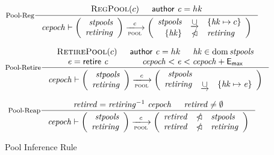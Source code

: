 \begin{figure}
  \begin{equation}\label{eq:pool-reg}
    \inference[Pool-Reg]
    {
      \RegPool{c} & \cauthor{c} = hk
    }
    {
      \var{cepoch} \vdash
      \left(
      \begin{array}{r}
        \var{stpools} \\
        \var{retiring}
      \end{array}
      \right)
      \trans{pool}{c}
      \left(
      \begin{array}{rcl}
        \var{stpools} & \unionoverride & \{\var{hk} \mapsto c\} \\
        \{\var{hk}\} & \subtractdom & \var{retiring} \\
      \end{array}
      \right)
    }
  \end{equation}


  \begin{equation}\label{eq:pool-ret}
    \inference[Pool-Retire]
    {
    \RetirePool{c} & \cauthor{c} = hk & \var{hk} \in \dom \var{stpools} \\
    \var{e} = \retire{c} & \var{cepoch} < \var{e} < \var{cepoch} + \emax
  }
  {
    \var{cepoch} \vdash
    \left(
      \begin{array}{r}
        \var{stpools} \\
        \var{retiring}
      \end{array}
    \right)
    \trans{pool}{c}
    \left(
      \begin{array}{rcl}
        \var{stpools} \\
        \var{retiring} & \unionoverride & \{\var{hk} \mapsto \var{e}\} \\
      \end{array}
    \right)
  }
  \end{equation}

  \begin{equation}\label{eq:pool-reap}
    \inference[Pool-Reap]
    {
      \var{retired} = \var{retiring}^{-1}~\var{cepoch}
      & \var{retired} \neq \emptyset
    }
    {
      \var{cepoch} \vdash
      \left(
      \begin{array}{r}
        \var{stpools} \\
        \var{retiring}
      \end{array}
      \right)
      \trans{pool}{c}
      \left(
      \begin{array}{rcl}
        \var{retired} & \subtractdom & \var{stpools} \\
        \var{retired} & \subtractdom & \var{retiring} \\
      \end{array}
      \right)
    }
  \end{equation}
  \caption{Pool Inference Rule}
  \label{fig:pool-rules}

\end{figure}

